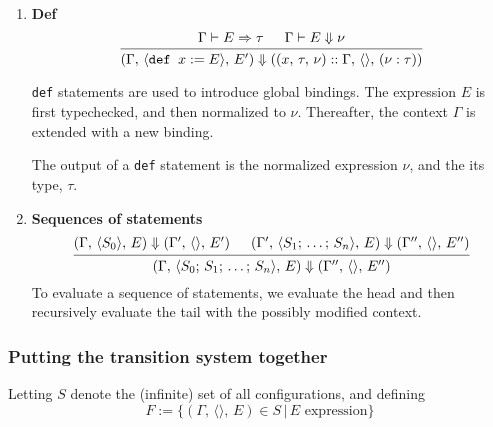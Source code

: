 \documentclass{article}
\begin{document}
\begin{enumerate}
 

\item \textbf{Def} \\
  \[
    \begin{prooftree}
      \hypo{\Gamma \vdash E \Rightarrow \tau}
      \hypo{\Gamma \vdash E \Downarrow \nu}
      \infer2{(\Gamma, \, \langle \deff x := E \rangle, \, E') \Downarrow
        ((x, \, \tau, \, \nu) :: \Gamma, \, \langle \rangle, \, (\nu : \tau))}
    \end{prooftree}
  \]

  \texttt{def} statements are used to introduce global bindings.
  The expression $E$ is first typechecked, and then normalized to $\nu$.
  Thereafter, the context $\Gamma$ is extended with a new binding.

  The output of a \texttt{def} statement is the normalized expression $\nu$, and the
  its type, $\tau$.
  

\item \textbf{Sequences of statements} \\
  \[
    \begin{prooftree}
      \hypo{(\Gamma, \, \langle S_0 \rangle, \, E) \Downarrow
        (\Gamma', \, \langle \rangle, \, E') }
      \hypo{(\Gamma', \, \langle S_1; \, \dots; \, S_n \rangle, \, E) \Downarrow
        (\Gamma'', \, \langle \rangle, \, E'') }
      \infer2{(\Gamma, \, \langle S_0; \, S_1; \, \dots; \, S_n \rangle, \, E) \Downarrow
        (\Gamma'', \, \langle \rangle, \, E'') }
    \end{prooftree}
  \]
  To evaluate a sequence of statements, we evaluate the head and then recursively
  evaluate the tail with the possibly modified context.

\end{enumerate}

\subsubsection{Putting the transition system together}
Letting $S$ denote the (infinite) set of all configurations, and defining
\[ F := \{ (\Gamma, \, \langle \rangle, \, E) \in S \, | \, E \text{ expression} \} \]
\end{document}
